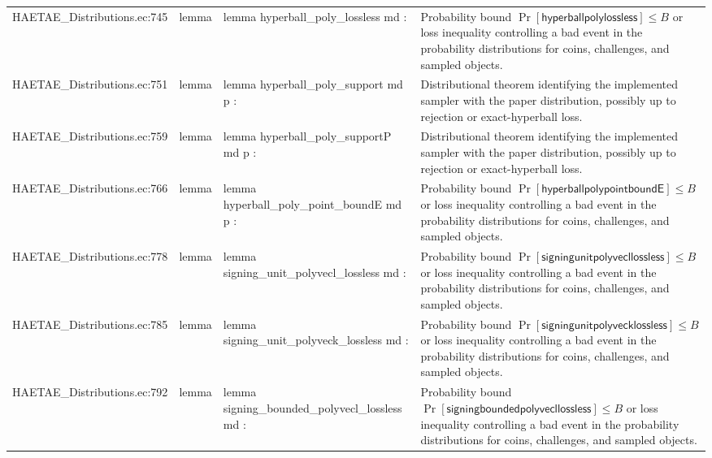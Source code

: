 \documentclass[10pt]{article}
\begin{document}
\begin{longtable}{L{0.11\textwidth}L{0.055\textwidth}L{0.385\textwidth}L{0.41\textwidth}}
HAETAE\_\allowbreak{}Distributions.\allowbreak{}ec:\allowbreak{}745 & lemma & {\ttfamily\scriptsize lemma hyperball\_\allowbreak{}poly\_\allowbreak{}lossless md :} & Probability bound $\Pr[\mathsf{hyperballpolylossless}]\le B$ or loss inequality controlling a bad event in the probability distributions for coins, challenges, and sampled objects. \\
HAETAE\_\allowbreak{}Distributions.\allowbreak{}ec:\allowbreak{}751 & lemma & {\ttfamily\scriptsize lemma hyperball\_\allowbreak{}poly\_\allowbreak{}support md p :} & Distributional theorem identifying the implemented sampler with the paper distribution, possibly up to rejection or exact-hyperball loss. \\
HAETAE\_\allowbreak{}Distributions.\allowbreak{}ec:\allowbreak{}759 & lemma & {\ttfamily\scriptsize lemma hyperball\_\allowbreak{}poly\_\allowbreak{}supportP md p :} & Distributional theorem identifying the implemented sampler with the paper distribution, possibly up to rejection or exact-hyperball loss. \\
HAETAE\_\allowbreak{}Distributions.\allowbreak{}ec:\allowbreak{}766 & lemma & {\ttfamily\scriptsize lemma hyperball\_\allowbreak{}poly\_\allowbreak{}point\_\allowbreak{}boundE md p :} & Probability bound $\Pr[\mathsf{hyperballpolypointboundE}]\le B$ or loss inequality controlling a bad event in the probability distributions for coins, challenges, and sampled objects. \\
HAETAE\_\allowbreak{}Distributions.\allowbreak{}ec:\allowbreak{}778 & lemma & {\ttfamily\scriptsize lemma signing\_\allowbreak{}unit\_\allowbreak{}polyvecl\_\allowbreak{}lossless md :} & Probability bound $\Pr[\mathsf{signingunitpolyvecllossless}]\le B$ or loss inequality controlling a bad event in the probability distributions for coins, challenges, and sampled objects. \\
HAETAE\_\allowbreak{}Distributions.\allowbreak{}ec:\allowbreak{}785 & lemma & {\ttfamily\scriptsize lemma signing\_\allowbreak{}unit\_\allowbreak{}polyveck\_\allowbreak{}lossless md :} & Probability bound $\Pr[\mathsf{signingunitpolyvecklossless}]\le B$ or loss inequality controlling a bad event in the probability distributions for coins, challenges, and sampled objects. \\
HAETAE\_\allowbreak{}Distributions.\allowbreak{}ec:\allowbreak{}792 & lemma & {\ttfamily\scriptsize lemma signing\_\allowbreak{}bounded\_\allowbreak{}polyvecl\_\allowbreak{}lossless md :} & Probability bound $\Pr[\mathsf{signingboundedpolyvecllossless}]\le B$ or loss inequality controlling a bad event in the probability distributions for coins, challenges, and sampled objects. \\

\end{longtable}
\end{document}
